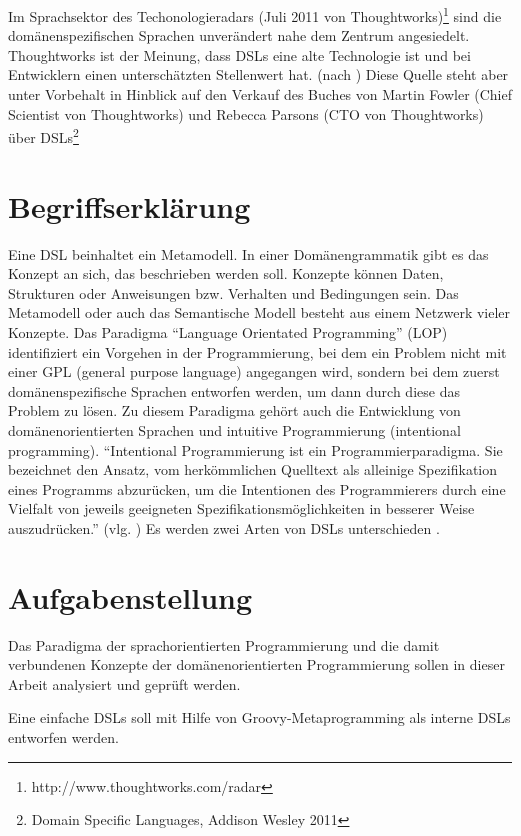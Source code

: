 \documentclass[11pt,english,ngerman, headsepline]{scrreprt}
\begin{document}
Im Sprachsektor des Techonologieradars (Juli 2011 von
Thoughtworks)\footnote{http://www.thoughtworks.com/radar}
sind die domänenspezifischen Sprachen unverändert nahe dem Zentrum
angesiedelt. Thoughtworks ist der Meinung, dass DSLs eine alte Technologie ist
und bei Entwicklern einen unterschätzten Stellenwert
hat. (nach \cite{thoughtworks-tr}) Diese Quelle steht aber unter Vorbehalt in
Hinblick auf den Verkauf des Buches von Martin Fowler (Chief Scientist von
Thoughtworks) und Rebecca Parsons (CTO von Thoughtworks) über DSLs\footnote{Domain Specific
Languages, Addison Wesley 2011} 

\section{Begriffserklärung}
Eine DSL beinhaltet ein Metamodell. In einer Domänengrammatik gibt es das
Konzept an sich, das beschrieben werden soll. Konzepte können Daten, Strukturen
oder Anweisungen bzw. Verhalten und Bedingungen sein. Das Metamodell oder auch
das Semantische Modell besteht aus einem Netzwerk vieler Konzepte. Das Paradigma
“Language Orientated Programming” (LOP) identifiziert ein Vorgehen in der
Programmierung, bei dem ein Problem nicht mit einer GPL (general purpose
language) angegangen wird, sondern bei dem zuerst domänenspezifische Sprachen
entworfen werden, um dann durch diese das Problem zu lösen. Zu diesem Paradigma
gehört auch die Entwicklung von domänenorientierten Sprachen und intuitive
Programmierung (intentional programming). “Intentional Programmierung ist ein
Programmierparadigma. Sie bezeichnet den Ansatz, vom herkömmlichen Quelltext als
alleinige Spezifikation eines Programms abzurücken, um die Intentionen des
Programmierers durch eine Vielfalt von jeweils geeigneten
Spezifikationsmöglichkeiten in besserer Weise auszudrücken.” (vlg.
\cite{wikiIntentional}) Es werden zwei Arten von DSLs unterschieden
\cite{fowler2011domain}. 


\section{Aufgabenstellung }

Das Paradigma der sprachorientierten Programmierung und die damit verbundenen
Konzepte der domänenorientierten Programmierung sollen in dieser Arbeit
analysiert und geprüft werden. 


Eine einfache DSLs soll mit Hilfe von
Groovy-Metaprogramming als interne DSLs entworfen werden.
\end{document}
